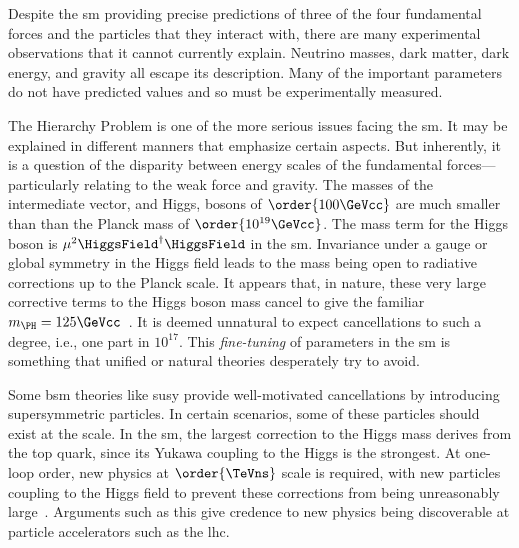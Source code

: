 
Despite the \acrlong{sm} providing precise predictions of three of the four fundamental forces and the particles that they interact with, there are many experimental observations that it cannot currently explain. Neutrino masses, dark matter, dark energy, and gravity all escape its description. Many of the important parameters do not have predicted values and so must be experimentally measured.

The Hierarchy Problem is one of the more serious issues facing the \acrlong{sm}. It may be explained in different manners that emphasize certain aspects. But inherently, it is a question of the disparity between energy scales of the fundamental forces---particularly relating to the weak force and gravity. The masses of the intermediate vector, and Higgs, bosons of $\order{\text{100}\GeVcc}$ are much smaller than than the Planck mass of $\order{\text{10}^{19}\GeVcc}$. The mass term for the Higgs boson is $\mu^2 \HiggsField^{\dagger} \HiggsField$ in the \acrshort{sm}. Invariance under a gauge or global symmetry in the Higgs field leads to the mass being open to radiative corrections up to the Planck scale. It appears that, in nature, these very large corrective terms to the Higgs boson mass cancel to give the familiar $m_{\PH} = \text{125}\GeVcc$~\cite{Chatrchyan:2012xdj,Aad:2012tfa}. It is deemed unnatural to expect cancellations to such a degree, i.e., one part in $\text{10}^{17}$. This \emph{fine-tuning} of parameters in the \acrlong{sm} is something that unified or natural theories desperately try to avoid.

Some \acrshort{bsm} theories like \acrlong{susy} provide well-motivated cancellations by introducing supersymmetric particles. In certain scenarios, some of these particles should exist at the \TeVns scale. In the \acrshort{sm}, the largest correction to the Higgs mass derives from the top quark, since its Yukawa coupling to the Higgs is the strongest. At one-loop order, new physics at $\order{\TeVns}$ scale is required, with new particles coupling to the Higgs field to prevent these corrections from being unreasonably large~\cite{Farina:2013ssa}. Arguments such as this give credence to new physics being discoverable at particle accelerators such as the \acrlong{lhc}.




